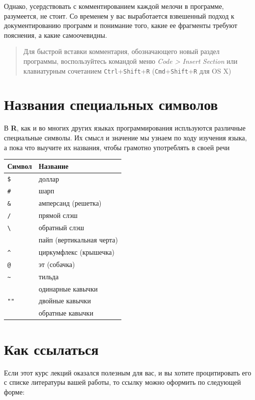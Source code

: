 \documentclass[]{book}
\begin{document}
Однако, усердствовать с комментированием каждой мелочи в программе,
разумеется, не стоит. Со временем у вас выработается взвешенный подход к
документированию программ и понимание того, какие ее фрагменты требуют
пояснения, а какие самоочевидны.

\begin{quote}
Для быстрой вставки комментария, обозначающего новый раздел программы,
воспользуйтесь командой меню \emph{Code \textgreater{} Insert Section}
или клавиатурным сочетанием \texttt{Ctrl}+\texttt{Shift}+\texttt{R}
(\texttt{Cmd}+\texttt{Shift}+\texttt{R} для OS X)
\end{quote}

\section*{Названия специальных символов}\label{--}

В \textbf{R}, как и во многих других языках программирования испльзуются
различные специальные символы. Их смысл и значение мы узнаем по ходу
изучения языка, а пока что выучите их названия, чтобы грамотно
употреблять в своей речи

\begin{longtable}[]{@{}ll@{}}
\toprule
Символ & Название\tabularnewline
\midrule
\endhead
\texttt{\$} & доллар\tabularnewline
\texttt{\#} & шарп\tabularnewline
\texttt{\&} & амперсанд (решетка)\tabularnewline
\texttt{/} & прямой слэш\tabularnewline
\texttt{\textbackslash{}} & обратный слэш\tabularnewline
\texttt{\textbar{}} & пайп (вертикальная черта)\tabularnewline
\texttt{\^{}} & циркумфлекс (крышечка)\tabularnewline
\texttt{@} & эт (собачка)\tabularnewline
\texttt{\textasciitilde{}} & тильда\tabularnewline
\texttt{\textquotesingle{}\textquotesingle{}} & одинарные
кавычки\tabularnewline
\texttt{""} & двойные кавычки\tabularnewline
\texttt{\textasciigrave{}\textasciigrave{}} & обратные
кавычки\tabularnewline
\bottomrule
\end{longtable}

\section*{Как ссылаться}\label{-}

Если этот курс лекций оказался полезным для вас, и вы хотите
процитировать его с списке литературы вашей работы, то ссылку можно
оформить по следующей форме:
\end{document}
